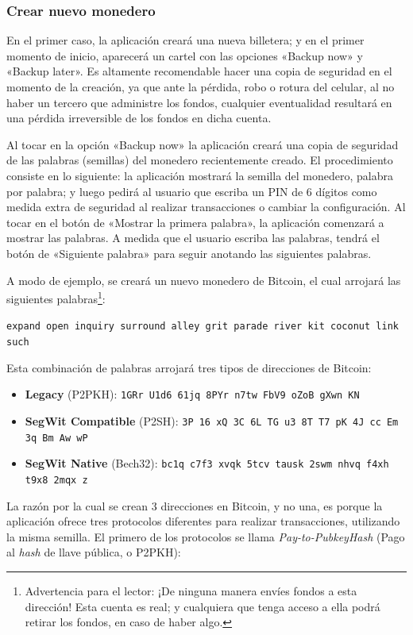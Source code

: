 \documentclass[12pt,a4paper,twoside]{book}
\begin{document}
\subsubsection{Crear nuevo monedero}
En el primer caso, la aplicación creará una nueva billetera; y en el primer momento de inicio, aparecerá un cartel con las opciones «Backup now» y «Backup later». Es altamente recomendable hacer una copia de seguridad en el momento de la creación, ya que ante la pérdida, robo o rotura del celular, al no haber un tercero que administre los fondos, cualquier eventualidad resultará en una pérdida irreversible de los fondos en dicha cuenta.

Al tocar en la opción «Backup now» la aplicación creará una copia de seguridad de las palabras (semillas) del monedero recientemente creado. El procedimiento consiste en lo siguiente: la aplicación mostrará la semilla del monedero, palabra por palabra; y luego pedirá al usuario que escriba un PIN de 6 dígitos como medida extra de seguridad al realizar transacciones o cambiar la configuración. Al tocar en el botón de «Mostrar la primera palabra», la aplicación comenzará a mostrar las palabras. A medida que el usuario escriba las palabras, tendrá el botón de «Siguiente palabra» para seguir anotando las siguientes palabras.

A modo de ejemplo, se creará un nuevo monedero de Bitcoin, el cual arrojará las siguientes palabras\footnote{Advertencia para el lector: ¡De ninguna manera envíes fondos a esta dirección! Esta cuenta es real; y cualquiera que tenga acceso a ella podrá retirar los fondos, en caso de haber algo.}:

\begin{center}
\texttt{expand open inquiry surround alley grit parade river kit coconut link such}
\end{center}

Esta combinación de palabras arrojará tres tipos de direcciones de Bitcoin:

\begin{itemize}
\item \textbf{Legacy} (P2PKH): \texttt{1GRr U1d6 61jq 8PYr n7tw FbV9 oZoB gXwn KN}
\item \textbf{SegWit Compatible} (P2SH): \texttt{3P 16 xQ 3C 6L TG u3 8T T7 pK 4J cc Em 3q Bm Aw wP}
\item \textbf{SegWit Native} (Bech32): \texttt{bc1q c7f3 xvqk 5tcv tausk 2swm nhvq f4xh t9x8 2mqx z}
\end{itemize}

La razón por la cual se crean 3 direcciones en Bitcoin, y no una, es porque la aplicación ofrece tres protocolos diferentes para realizar transacciones, utilizando la misma semilla. El primero de los protocolos se llama \textit{Pay-to-PubkeyHash} (Pago al \textit{hash} de llave pública, o P2PKH):
\end{document}
